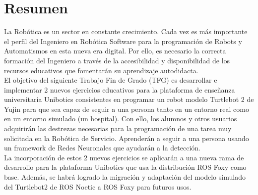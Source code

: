 \chapter*{Resumen}

La Robótica es un sector en constante crecimiento.
Cada vez es más importante el perfil del Ingeniero en Robótica Software para la programación de Robots y Automatismos en esta nueva era digital.
Por ello, es necesario la correcta formación del Ingeniero a través de la accesibilidad
y disponibilidad de los recursos educativos que fomentarán su aprendizaje autodidacta.\\

El objetivo del siguiente Trabajo Fin de Grado (TFG) es desarrollar e implementar 2 nuevos ejercicios educativos para la plataforma
de enseñanza universitaria Unibotics consistentes en programar un robot modelo Turtlebot 2 de Yujin para que sea capaz de seguir a
una persona tanto en un entorno real como en un entorno simulado (un hospital). Con ello, los alumnos y otros usuarios adquirirán las destrezas necesarias 
para la programación de una tarea muy solicitada en la Robótica de Servicio. Aprenderán a seguir a una persona usando un framework de
Redes Neuronales que ayudarán a la detección.\\

La incorporación de estos 2 nuevos ejercicios se aplicarán a una nueva rama de desarrollo para la plataforma Unibotics que usa la distribución ROS Foxy como base.
Además, se habrá logrado la migración y adaptación del modelo simulado del Turtlebot2 de ROS Noetic a ROS Foxy para futuros usos.